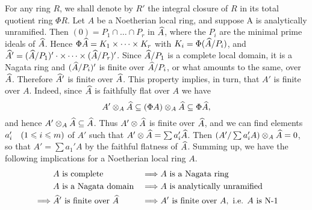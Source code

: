 \documentclass[../main]{subfiles}
\begin{document}
\newparagraph For any ring $R$, we shall denote by $R'$ the integral closure of $R$ in its total quotient ring $\Phi R$. Let $A$ be a Noetherian local ring, and suppose A is analytically unramified. Then $(0)=P_1 \cap \ldots \cap P_r$ in $\widehat{A}$, where the $P_i$ are the minimal prime ideals of $\widehat{A}$. Hence $\Phi\widehat{A}=K_1 \times \dots \times K_r$ with $K_i=\Phi(\widehat{A} / P_i)$, and ${\widehat{A}}'=(\widehat{A} / P_1)' \cdot \times \dots \times(\widehat{A} / P_r)'$. Since $\widehat{A} / P_1$ is a complete local domain, it is a Nagata ring and $(\widehat{A} / P_i)'$ is finite over $\widehat{A} / P_i$, or what amounts to the same, over $\widehat{A}$. Therefore ${\widehat{A}}'$ is finite over $\widehat{A}$. This property implies, in turn, that $A'$ is finite over $A$. Indeed, since $\widehat{A}$ is faithfully flat over $A$ we have \[A'\otimes_A \widehat{A}\subseteq (\Phi A)\otimes_A \widehat{A} \subseteq \Phi \widehat{A},\] and hence $A' \otimes_{A} \widehat{A} \subseteq \widehat{A}$. Thus $A' \otimes \widehat{A}$ is finite over $\widehat{A}$, and we can find elements $a_i'\for{1 \leqslant i \leqslant m}$ of $A'$ such that $A' \otimes \widehat{A}=\sum a_i' \widehat{A}$. Then $(A' / \sum a_i' A) \otimes_{A} {\widehat{A}}=0$, so that $A'=\sum a_1' A$ by the faithful flatness of $\widehat{A}$. Summing up, we have the following implications for a Noetherian local ring $A$.
\[\begin{aligned}
&A\text{ is complete }&\implies& A\text{ is a Nagata ring}\\
&A\text{ is a Nagata domain} &\implies& A \text{ is analytically unramified}\\\implies& {\widehat{A}}' \text{ is finite over } \widehat{A}&\implies& A' \text{ is finite over }A,\text{ i.e. }A\text{ is N-1}\end{aligned}\]
\end{document}
